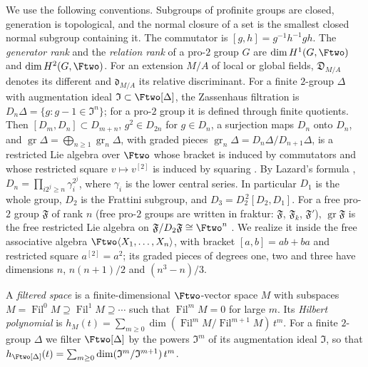We use the following conventions. Subgroups of profinite groups are closed,
generation is topological, and the normal closure of a set is the smallest
closed normal subgroup containing it. The commutator is
$[g,h]=g^{-1}h^{-1}gh$. The \emph{generator rank} and the \emph{relation
rank} of a pro-$2$ group $G$ are $\dim H^1(G,\Ftwo)$ and $\dim H^2(G,\Ftwo)$.
For an extension $M/A$ of local or global fields, $\mathfrak D_{M/A}$ denotes
its different and $\mathfrak d_{M/A}$ its relative discriminant. For a finite
$2$-group $\Delta$ with augmentation
ideal $\mathfrak I\subset\Ftwo[\Delta]$, the Zassenhaus filtration is
$D_n\Delta=\{g:g-1\in\mathfrak I^n\}$; for a pro-$2$ group it is defined
through finite quotients. Then $[D_m,D_n]\subset D_{m+n}$, $g^2\in D_{2n}$
for $g\in D_n$, a surjection maps $D_n$ onto $D_n$, and
$\operatorname{gr}\Delta=\bigoplus_{n\ge1}\operatorname{gr}_n\Delta$, with
graded pieces $\operatorname{gr}_n\Delta=D_n\Delta/D_{n+1}\Delta$, is a
restricted Lie algebra over $\Ftwo$ whose bracket is induced by commutators
and whose restricted square $v\mapsto v^{[2]}$ is induced by squaring
\cite{Jennings,Quillen,Ershov2012}. By Lazard's formula
\cite[Proposition~3.2]{Ershov2012}, $D_n=\prod_{i2^j\ge n}\gamma_i^{2^j}$,
where $\gamma_i$ is the lower central series. In particular $D_1$ is the
whole group, $D_2$ is the Frattini subgroup, and $D_3=D_2^{\,2}[D_2,D_1]$. For
a free pro-$2$ group $\mathfrak F$ of rank $n$ (free pro-$2$ groups are
written in fraktur: $\mathfrak F$, $\mathfrak F_k$, $\mathfrak F'$),
$\operatorname{gr}\mathfrak F$ is the free restricted Lie algebra on $\mathfrak F/D_2\mathfrak F\cong\Ftwo^n$
\cite{Quillen,Ershov2012}. We realize it inside the free associative
algebra $\Ftwo\langle X_1,\dots,X_n\rangle$, with bracket $[a,b]=ab+ba$ and
restricted square $a^{[2]}=a^2$; its graded pieces of degrees one, two and
three have dimensions $n$, $n(n+1)/2$ and $(n^3-n)/3$.

\begin{definition}\label{tw:hilbert-def}
A \emph{filtered space} is a finite-dimensional $\Ftwo$-vector space $M$
with subspaces
$M=\operatorname{Fil}^0M\supseteq\operatorname{Fil}^1M\supseteq\cdots$ such
that $\operatorname{Fil}^mM=0$ for large $m$. Its \emph{Hilbert polynomial}
is
$h_M(t)=\sum_{m\ge0}\dim(\operatorname{Fil}^mM/\operatorname{Fil}^{m+1}M)\,t^m$.
For a finite $2$-group $\Delta$ we filter $\Ftwo[\Delta]$ by the powers
$\mathfrak I^m$ of its augmentation ideal $\mathfrak I$, so that
$h_{\Ftwo[\Delta]}(t)=\sum_{m\ge0}\dim(\mathfrak I^m/\mathfrak I^{m+1})\,t^m$.
\end{definition}

